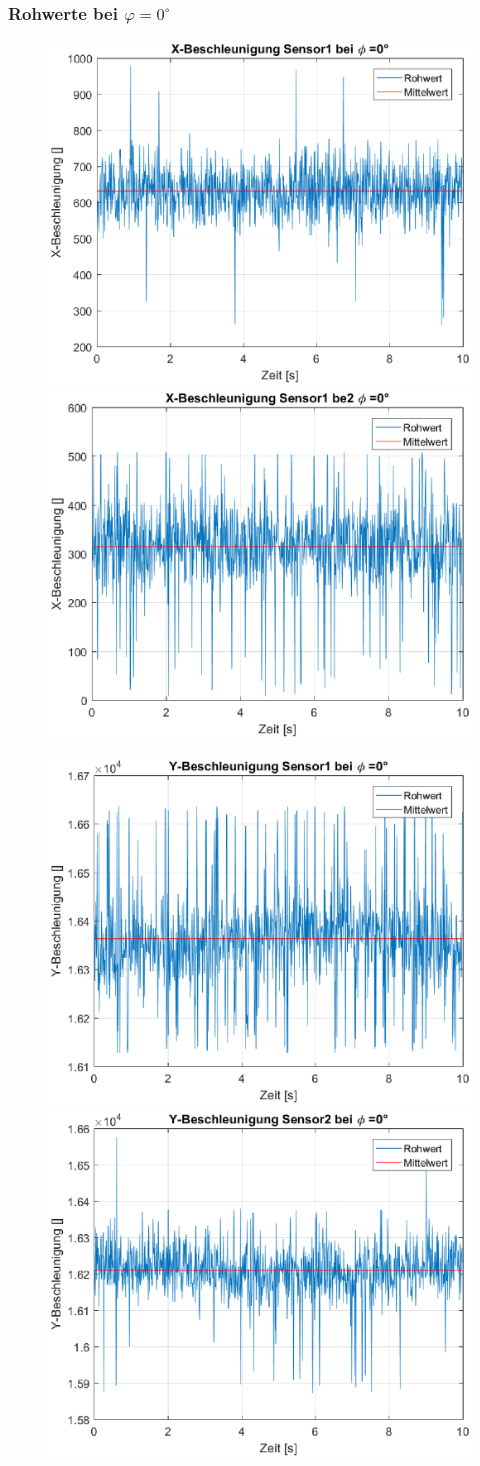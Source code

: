 \newpage
{\subsubsection{Rohwerte bei $\varphi = 0^{\circ}$}
\begin{figure}[h]
	\includegraphics[width=0.5\linewidth]{img/X1__dd___phi_0.eps}
	\includegraphics[width=0.5\linewidth]{img/X2__dd___phi_0.eps}
\end{figure}
\begin{figure}[h]
	\includegraphics[width=0.5\linewidth]{img/Y1__dd___phi_0.eps}
	\includegraphics[width=0.5\linewidth]{img/Y2__dd___phi_0.eps}
\end{figure}}

